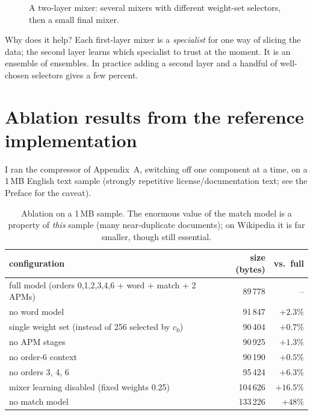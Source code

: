 \documentclass[11pt,a4paper,openany]{book}
\theoremstyle{definition}
\theoremstyle{remark}
\begin{document}
\begin{figure}[h]
\centering
{}
\caption{A two-layer mixer: several mixers with different weight-set selectors, then a small final mixer.}
\end{figure}

Why does it help? Each first-layer mixer is a \emph{specialist} for one way of slicing the data; the second layer learns which specialist to trust at the moment. It is an ensemble of ensembles. In practice adding a second layer and a handful of well-chosen selectors gives a few percent.

\section{Ablation results from the reference implementation}

I ran the compressor of Appendix~A, switching off one component at a time, on a 1\,MB English text sample (strongly repetitive license/documentation text; see the Preface for the caveat).

\begin{table}[h]
\centering
\begin{tabular}{@{}lrr@{}}
\toprule
configuration & size (bytes) & vs.\ full\\
\midrule
full model (orders 0,1,2,3,4,6 + word + match + 2 APMs) & 89\,778 & --\\
no word model & 91\,847 & $+2.3\%$\\
single weight set (instead of 256 selected by $c_0$) & 90\,404 & $+0.7\%$\\
no APM stages & 90\,925 & $+1.3\%$\\
no order-6 context & 90\,190 & $+0.5\%$\\
no orders 3, 4, 6 & 95\,424 & $+6.3\%$\\
mixer learning disabled (fixed weights 0.25) & 104\,626 & $+16.5\%$\\
no match model & 133\,226 & $+48\%$\\
\bottomrule
\end{tabular}
\caption{Ablation on a 1\,MB sample. The enormous value of the match model is a property of \emph{this} sample (many near-duplicate documents); on Wikipedia it is far smaller, though still essential.}
\end{table}
\end{document}
